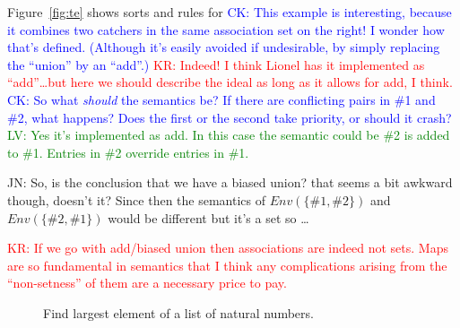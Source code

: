 \documentclass[letterpaper,11pt]{article}
\newcommand{\CK}[1]{\textcolor{blue}{CK: #1}}
\newcommand{\KR}[1]{\textcolor{red}{KR: #1}}
\newcommand{\LV}[1]{\textcolor{green}{LV: #1}}
\newcommand{\JN}[1]{\textcolor{orange!70!black}{JN: #1}}
\begin{document}
\begin{example}\label{ex:te}
  Figure~\ref{fig:te} shows sorts and rules for 
\CK{This example is interesting, because it combines two catchers in
the same association set on the right! I wonder how that's defined.
(Although it's easily avoided if undesirable, by simply replacing the
``union'' by an ``add''.)}
\KR{Indeed! I think Lionel has it implemented as ``add''…but here we should describe the ideal as
 long as it allows for add, I think.}
\CK{So what \emph{should} the semantics be?  If there are conflicting
 pairs in \#1 and \#2, what happens? Does the first or the second take
 priority, or should it crash?}
\LV{Yes it's implemented as add. In this case the semantic could
be \#2 is added to \#1. Entries in \#2 override entries in \#1.}

\JN{So, is the conclusion that we have a biased union? that seems a bit awkward though, doesn't it?
  Since then the semantics of $Env(\{\#1,\#2\})$ and $Env(\{\#2,\#1\})$ would be different but it's
  a set so \dots}

\KR{If we go with add/biased union then associations are indeed not sets. Maps are so fundamental in
  semantics that I think any complications arising from the ``non-setness'' of them are a necessary
  price to pay.}

\end{example}

\begin{figure}[h!t]
  \caption{Find largest element of a list of natural numbers.}
  \label{fig:pick}
\end{figure}
\end{document}
